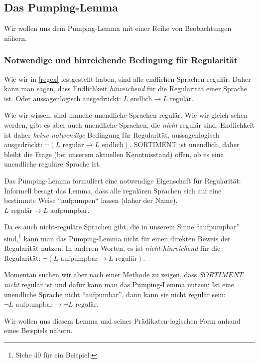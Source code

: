 \subsection{Das Pumping-Lemma}

Wir wollen uns dem Pumping-Lemma mit einer Reihe von Beobachtungen nähern.

\subsubsection{Notwendige und hinreichende Bedingung für Regularität}

Wie wir in \autoref{regex} festgestellt haben, sind alle endlichen Sprachen regulär.
Daher kann man sagen, dass Endlichkeit \emph{hinreichend} für die Regularität einer Sprache ist.
Oder aussagenlogisch ausgedrückt: $L \text{ endlich} \rightarrow L \text{ regulär}$.


Wie wir wissen, sind manche unendliche Sprachen regulär.
Wie wir gleich sehen werden, gibt es aber auch unendliche Sprachen,
die \emph{nicht} regulär sind.
Endlichkeit ist daher \emph{keine notwendige} Bedingung für Regularität,
aussagenlogisch ausgedrückt: $\neg (L \text{ regulär} \rightarrow L \text{ endlich})$.
SORTIMENT ist unendlich, daher bleibt die Frage (bei unserem aktuellen Kenntnisstand) offen,
ob es eine unendliche reguläre Sprache ist.

Das Pumping-Lemma formuliert eine notwendige Eigenschaft für Regularität:
Informell besagt das Lemma,
dass alle regulären Sprachen sich auf eine bestimmte Weise ``aufpumpen`` lassen (daher der Name).
 $L \text{ regulär} \rightarrow L \text{ aufpumpbar}$.

Da es auch nicht-reguläre Sprachen gibt, die in unserem Sinne ``aufpumpbar'' sind,\footnote{
    Siehe \cite{schoening} 40 für ein Beispiel.}
kann man das Pumping-Lemma nicht für einen direkten Beweis der Regularität nutzen.
In anderen Worten, es ist \emph{nicht hinreichend} für die Regularität:
$\neg(L \text{ aufpumpbar}  \rightarrow L \text{ regulär})$.

Momentan suchen wir aber nach einer Methode zu zeigen,
dass $SORTIMENT$ \emph{nicht} regulär ist
und dafür kann man das Pumping-Lemma nutzen:
Ist eine unendliche Sprache nicht ``aufpumbar'',
dann kann sie nicht regulär sein:\linebreak
$\neg L \text{ aufpumpbar}  \rightarrow \neg L \text{ regulär}$.

Wir wollen uns diesem Lemma und seiner Prädikaten-logischen Form anhand eines Beispiels nähern.

